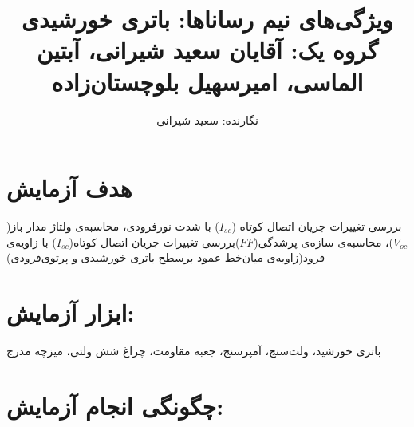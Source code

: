 \documentclass{article}
\begin{document}
	
	\title {ویژگی‌های نیم رساناها: باتری‌ خورشیدی\\
		\vspace{0.5cm}
		\large گروه یک: آقایان سعید شیرانی، آبتین الماسی، امیرسهیل بلوچستان‌زاده\\}
	
	\author{نگارنده: سعید شیرانی} 
	
	\maketitle
	\newpage{}
	\normalsize 
	
	\section{هدف آزمایش}
	\vspace{5mm}
	\normalsize
	
	بررسی تغییرات جریان اتصال کوتاه ($I_{sc}$) با شدت نور‌فرودی، محاسبه‌ی ولتاژ مدار باز($V_{oc}$)، محاسبه‌ی سازه‌ی پرشدگی($FF$)بررسی تغییرات جریان اتصال کوتاه($I_{sc}$) با زاویه‌‌ی فرود(زاویه‌ی میان‌خط عمود برسطح باتری خورشیدی و پرتوی‌فرودی)
	
	\section{ابزار آزمایش:}
	باتری خورشید، ولت‌سنج، آمپرسنج، جعبه مقاومت، چراغ شش ولتی، میزچه مدرج
	\section{چگونگی انجام آزمایش:}
	
\end{document}

